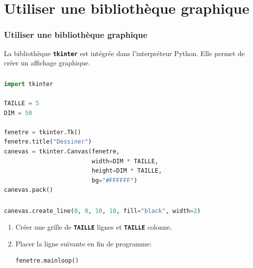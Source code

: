 \documentclass[svgnames,11pt]{beamer}
\begin{document}
\section{Utiliser une bibliothèque graphique}
\begin{frame}
    \frametitle{Utiliser une bibliothèque graphique}

    \begin{aretenir}[]
    La bibliothèque \textbf{\texttt{tkinter}} est intégrée dans l'interpréteur Python. Elle permet de créer un affichage graphique.
    \end{aretenir}

\end{frame}
\begin{frame}[fragile]
    \frametitle{}

\begin{center}
\begin{lstlisting}[language=Python , basicstyle=\ttfamily\small, xleftmargin=2em, xrightmargin=2em]
import tkinter

TAILLE = 5
DIM = 50

fenetre = tkinter.Tk()
fenetre.title("Dessiner")
canevas = tkinter.Canvas(fenetre,
                         width=DIM * TAILLE,
                         height=DIM * TAILLE,
                         bg="#FFFFFF")
canevas.pack()
\end{lstlisting}
\label{CODE}
\end{center}

\end{frame}
\begin{frame}[fragile]
    \frametitle{}

\begin{center}
\begin{lstlisting}[language=Python , basicstyle=\ttfamily\small, xleftmargin=2em, xrightmargin=1em]
canevas.create_line(0, 0, 10, 10, fill="black", width=2)
\end{lstlisting}
\label{CODE}
\end{center}
\begin{activite}
\begin{enumerate}
    \item Créer une grille de \textbf{\texttt{TAILLE}} lignes et \textbf{\texttt{TAILLE}} colonne.
    \item Placer la ligne suivante en fin de programme:
    \begin{lstlisting}[language=Python , basicstyle=\ttfamily\small, xleftmargin=2em, xrightmargin=2em]
fenetre.mainloop()
\end{lstlisting}
\end{enumerate}
\end{activite}
\end{frame}
\end{document}
